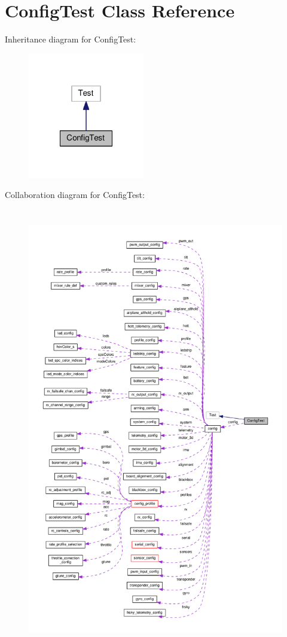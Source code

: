 \hypertarget{classConfigTest}{\section{Config\+Test Class Reference}
\label{classConfigTest}
}


Inheritance diagram for Config\+Test\+:\nopagebreak
\begin{figure}[H]
\begin{center}
\leavevmode
\includegraphics[width=144pt]{classConfigTest__inherit__graph}
\end{center}
\end{figure}


Collaboration diagram for Config\+Test\+:\nopagebreak
\begin{figure}[H]
\begin{center}
\leavevmode
\includegraphics[height=550pt]{classConfigTest__coll__graph}
\end{center}
\end{figure}
